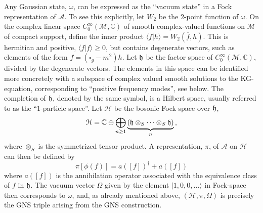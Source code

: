 \documentclass[12pt]{article}
\newcommand{\CC}{\mathbb{C}}
\newcommand{\eA}{\mathscr{A}}
\newcommand{\eH}{\mathscr{H}}
\renewcommand{\H}{\mathcal{H}}
\newcommand{\M}{\mathscr{M}}
\theoremstyle{plain}
\theoremstyle{definition}
\def\ben{\begin{equation}}
\def\een{\end{equation}}
\begin{document}
Any Gaussian state, $\omega$, can be expressed as the ``vacuum state'' in a Fock representation
of $\eA$. To see this explicitly, let $W_2$ be the 2-point function of $\omega$. On the complex linear
space $C^\infty_0(\M, \CC)$ of smooth complex-valued functions on $\M$ of compact support, define the
inner product $\langle f | h \rangle = W_2(\overline f, h)$. This
is hermitian and positive, $\langle f | f \rangle \ge 0$, but contains
degenerate vectors, such as elements of the form $f = (\square_g -
m^2)h$. Let $\frak h$ be the factor space of $C^\infty_0(\M,\CC)$, divided by the
degenerate vectors. The elements in this space can be
identified more concretely with a subspace of complex valued smooth solutions to the KG-equation, corresponding to ``positive frequency modes'', see below.
The completion of $\frak h$, denoted by the same symbol, is a Hilbert space, usually referred to
as the ``1-particle
space''. Let $\eH$ be the bosonic Fock space over $\frak h$,
\ben\label{fockspaceh}
\H = \CC \oplus \bigoplus_{n \ge 1} \underbrace{({\frak h} \otimes_S \cdots \otimes_S {\frak h})}_{n}\, ,
\een
where $\otimes_S$ is the symmetrized tensor product.
A representation, $\pi$, of $\eA$ on $\eH$ can then be defined by
\ben\label{phihbrack}
\pi[\phi(f)] = a([f])^\dagger + a([f])
\een
where $a([f])$ is the annihilation operator associated with the
equivalence class of $f$ in $\frak h$. The vacuum vector $\Omega$ given
by the element $|1,0,0,\dots \rangle$ in Fock-space then corresponds to $\omega$, and,
as already mentioned above, $(\eH, \pi, \Omega)$ is precisely the GNS triple arising from the GNS construction.
\end{document}
